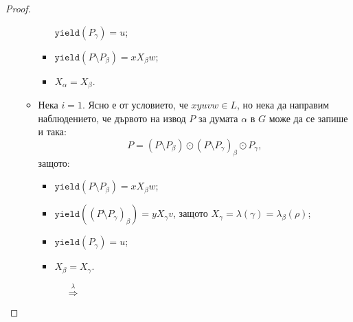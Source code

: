 \begin{proof}
\begin{enumerate}[1)]
\begin{itemize}
\begin{itemize}
        $\texttt{yield}(P_\gamma) = u$;
      \item
        $\texttt{yield}(P \setminus P_\beta) = x X_\beta w$;
      \item
        $X_\alpha = X_\beta$.
      \end{itemize}
    \item
      Нека $i = 1$.
      Ясно е от условието, че $xyuvw \in L$, но нека да направим наблюдението, че дървото на извод $P$ за думата $\alpha$ в $G$
      може да се запише и така:
      \[P = (P \setminus P_\beta) \odot (P \setminus P_\gamma)_\beta \odot P_\gamma, \]
      защото:
      \begin{itemize}
      \item
        $\texttt{yield}(P\setminus P_\beta) = x X_\beta w$;
      \item
        $\texttt{yield}((P \setminus P_\gamma)_\beta) = y X_\gamma v$, защото $X_\gamma = \lambda(\gamma) = \lambda_\beta(\rho)$;
      \item
        $\texttt{yield}(P_\gamma) = u$;
      \item
        $X_\beta = X_\gamma$.
      \end{itemize}

      \begin{figure*}[h!]

        \begin{subfigure}[t]{0.5\textwidth}
          \centering

        \end{subfigure}
        $\stackrel{\lambda}{\Rightarrow}$
        \begin{subfigure}[t]{0.5\textwidth}
          \centering
          

\end{subfigure}
\end{figure*}
\end{itemize}
\end{enumerate}
\end{proof}
